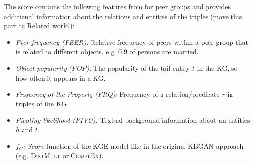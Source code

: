 The score contains the following features from \cite{arnaout2020enriching} for peer groups and provides additional information about the relations and entities of the triples (move this part to Related work?):
\begin{itemize}
    \item 
    \emph{Peer frequency (PEER):} 
    Relative frequency of peers within a peer group that is related to different objects, e.g. 0.9 of persons are married. 

    \item
    \emph{Object popularity (POP):} 
    The popularity of the tail entity $t$ in the \ac{KG}, so how often it appears in a \ac{KG}.
    
    \item 
    \emph{Frequency of the Property (FRQ):} 
    Frequency of a relation/predicate $r$ in triples of the \ac{KG}. 
    
    \item 
    \emph{Pivoting likelihood (PIVO):} 
    Textual background information about an entities $h$ and $t$.
    
    \item 
    \emph{$f_G$:} 
    $Score$ function of the \ac{KGE}  model like in the original \ac{KBGAN} approach (e.g. \textsc{DistMult}  or \textsc{ComplEx}).
\end{itemize}

